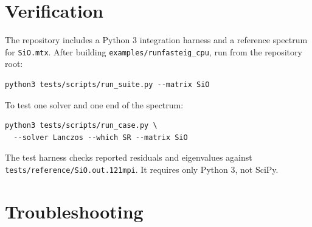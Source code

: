 \documentclass[11pt]{article}
\newcommand{\code}[1]{\texttt{#1}}
\begin{document}
\section{Verification}

The repository includes a Python 3 integration harness and a reference spectrum
for \code{SiO.mtx}.  After building \code{examples/runfasteig\_cpu}, run from
the repository root:

\begin{lstlisting}
python3 tests/scripts/run_suite.py --matrix SiO
\end{lstlisting}

To test one solver and one end of the spectrum:

\begin{lstlisting}
python3 tests/scripts/run_case.py \
  --solver Lanczos --which SR --matrix SiO
\end{lstlisting}

The test harness checks reported residuals and eigenvalues against
\code{tests/reference/SiO.out.121mpi}.  It requires only Python 3, not SciPy.

\section{Troubleshooting}
\end{document}
